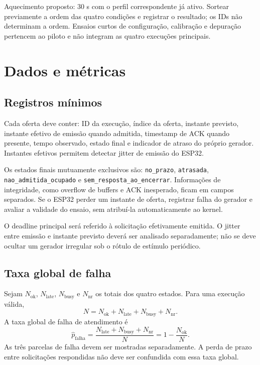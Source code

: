 \documentclass[11pt,a4paper]{article}
\begin{document}
Aquecimento proposto: 30 s com o perfil correspondente já ativo. Sortear previamente a ordem das quatro condições e registrar o resultado; os IDs não determinam a ordem. Ensaios curtos de configuração, calibração e depuração pertencem ao piloto e não integram as quatro execuções principais.


\section{Dados e métricas}

\subsection{Registros mínimos}

Cada oferta deve conter: ID da execução, índice da oferta, instante previsto, instante efetivo de emissão quando admitida, timestamp de ACK quando presente, tempo observado, estado final e indicador de atraso do próprio gerador. Instantes efetivos permitem detectar jitter de emissão do ESP32.

Os estados finais mutuamente exclusivos são: \texttt{no\_prazo}, \texttt{atrasada}, \texttt{nao\_admitida\_ocupado} e \texttt{sem\_resposta\_ao\_encerrar}. Informações de integridade, como overflow de buffers e ACK inesperado, ficam em campos separados. Se o ESP32 perder um instante de oferta, registrar falha do gerador e avaliar a validade do ensaio, sem atribuí-la automaticamente ao kernel.

O deadline principal será referido à solicitação efetivamente emitida. O jitter entre emissão e instante previsto deverá ser analisado separadamente; não se deve ocultar um gerador irregular sob o rótulo de estímulo periódico.

\subsection{Taxa global de falha}
Sejam $N_{\mathrm{ok}}$, $N_{\mathrm{late}}$, $N_{\mathrm{busy}}$ e $N_{\mathrm{nr}}$ os totais dos quatro estados. Para uma execução válida,
\begin{equation}
 N=N_{\mathrm{ok}}+N_{\mathrm{late}}+N_{\mathrm{busy}}+N_{\mathrm{nr}}.
\end{equation}
A taxa global de falha de atendimento é
\begin{equation}
 \widehat p_{\mathrm{falha}}=
 \frac{N_{\mathrm{late}}+N_{\mathrm{busy}}+N_{\mathrm{nr}}}{N}
 =1-\frac{N_{\mathrm{ok}}}{N}.
\end{equation}
As três parcelas de falha devem ser mostradas separadamente. A perda de prazo entre solicitações respondidas não deve ser confundida com essa taxa global.
\end{document}
